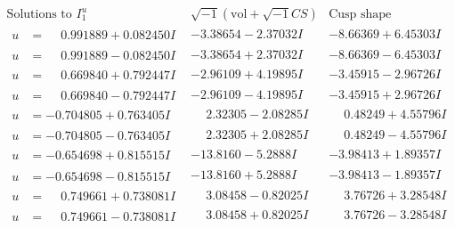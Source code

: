 \documentclass[1p]{elsarticle_modified}
\theoremstyle{definition}
\newcommand{\I}{\sqrt{-1}}
\begin{document}
$$\begin{array}{c|c|c}  
\text{Solutions to }I^u_{1}& \I (\text{vol} + \sqrt{-1}CS) & \text{Cusp shape}\\
 \hline 
\begin{aligned}
u &= \phantom{-}0.991889 + 0.082450 I\end{aligned}
 & -3.38654 - 2.37032 I & -8.66369 + 6.45303 I \\ \hline\begin{aligned}
u &= \phantom{-}0.991889 - 0.082450 I\end{aligned}
 & -3.38654 + 2.37032 I & -8.66369 - 6.45303 I \\ \hline\begin{aligned}
u &= \phantom{-}0.669840 + 0.792447 I\end{aligned}
 & -2.96109 + 4.19895 I & -3.45915 - 2.96726 I \\ \hline\begin{aligned}
u &= \phantom{-}0.669840 - 0.792447 I\end{aligned}
 & -2.96109 - 4.19895 I & -3.45915 + 2.96726 I \\ \hline\begin{aligned}
u &= -0.704805 + 0.763405 I\end{aligned}
 & \phantom{-}2.32305 - 2.08285 I & \phantom{-}0.48249 + 4.55796 I \\ \hline\begin{aligned}
u &= -0.704805 - 0.763405 I\end{aligned}
 & \phantom{-}2.32305 + 2.08285 I & \phantom{-}0.48249 - 4.55796 I \\ \hline\begin{aligned}
u &= -0.654698 + 0.815515 I\end{aligned}
 & -13.8160 - 5.2888 I & -3.98413 + 1.89357 I \\ \hline\begin{aligned}
u &= -0.654698 - 0.815515 I\end{aligned}
 & -13.8160 + 5.2888 I & -3.98413 - 1.89357 I \\ \hline\begin{aligned}
u &= \phantom{-}0.749661 + 0.738081 I\end{aligned}
 & \phantom{-}3.08458 - 0.82025 I & \phantom{-}3.76726 + 3.28548 I \\ \hline\begin{aligned}
u &= \phantom{-}0.749661 - 0.738081 I\end{aligned}
 & \phantom{-}3.08458 + 0.82025 I & \phantom{-}3.76726 - 3.28548 I \\ \hline\begin{aligned}

\end{aligned}
\end{array}$$
\end{document}

